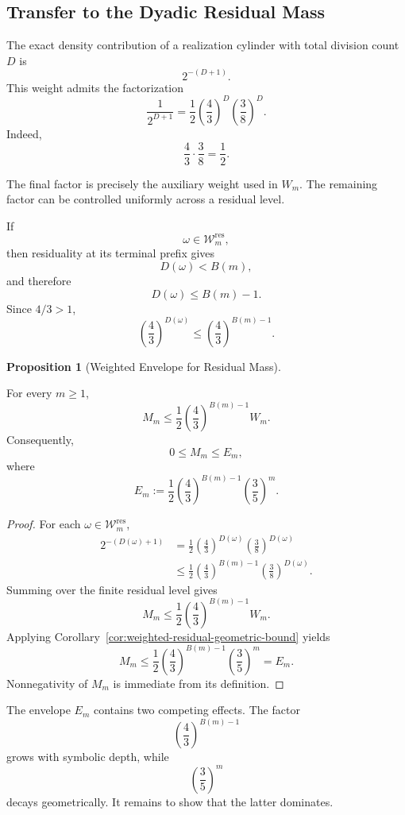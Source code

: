 \documentclass[12pt, oneside]{article}
\numberwithin{equation}{section}
\theoremstyle{definition}
\newtheorem{proposition}{Proposition}[section]
\theoremstyle{plain}
\theoremstyle{remark}
\begin{document}
\subsection{Transfer to the Dyadic Residual Mass}

The exact density contribution of a realization cylinder with total
division count \(D\) is
\[
2^{-(D+1)}.
\]
This weight admits the factorization
\[
\boxed{
\frac{1}{2^{D+1}}
=
\frac12
\left(\frac43\right)^D
\left(\frac38\right)^D.
}
\]
Indeed,
\[
\frac43\cdot\frac38=\frac12.
\]

The final factor is precisely the auxiliary weight used in \(W_m\). The
remaining factor can be controlled uniformly across a residual level.

If
\[
\omega\in\mathcal W_m^{\mathrm{res}},
\]
then residuality at its terminal prefix gives
\[
D(\omega)<B(m),
\]
and therefore
\[
D(\omega)\le B(m)-1.
\]
Since \(4/3>1\),
\[
\left(\frac43\right)^{D(\omega)}
\le
\left(\frac43\right)^{B(m)-1}.
\]

\begin{proposition}[Weighted Envelope for Residual Mass]
\label{prop:residual-weighted-envelope}

For every \(m\ge1\),
\[
M_m
\le
\frac12
\left(\frac43\right)^{B(m)-1}
W_m.
\]
Consequently,
\[
\boxed{
0\le M_m\le E_m,
}
\]
where
\[
E_m
:=
\frac12
\left(\frac43\right)^{B(m)-1}
\left(\frac35\right)^m.
\]
\end{proposition}

\begin{proof}
For each
\(\omega\in\mathcal W_m^{\mathrm{res}}\),
\[
\begin{aligned}
2^{-(D(\omega)+1)}
&=
\frac12
\left(\frac43\right)^{D(\omega)}
\left(\frac38\right)^{D(\omega)}
\\
&\le
\frac12
\left(\frac43\right)^{B(m)-1}
\left(\frac38\right)^{D(\omega)}.
\end{aligned}
\]
Summing over the finite residual level gives
\[
M_m
\le
\frac12
\left(\frac43\right)^{B(m)-1}W_m.
\]
Applying Corollary~\ref{cor:weighted-residual-geometric-bound} yields
\[
M_m
\le
\frac12
\left(\frac43\right)^{B(m)-1}
\left(\frac35\right)^m
=
E_m.
\]
Nonnegativity of \(M_m\) is immediate from its definition.
\end{proof}

The envelope \(E_m\) contains two competing effects. The factor
\[
\left(\frac43\right)^{B(m)-1}
\]
grows with symbolic depth, while
\[
\left(\frac35\right)^m
\]
decays geometrically. It remains to show that the latter dominates.
\end{document}
